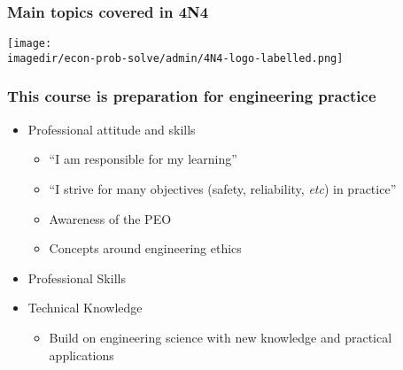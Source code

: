 \begin{frame}\frametitle{Main topics covered in 4N4}
	\begin{center}
		\texttt{[image: \\imagedir/econ-prob-solve/admin/4N4-logo-labelled.png]}
	\end{center}
	\vspace{-12pt}
	{\small {\color{brown}{This is a unique course: not taught anywhere else in Canada.}}}
\end{frame}

\begin{frame}\frametitle{This course is preparation for engineering practice}
	\begin{itemize}
		\item	Professional attitude and skills
		\begin{itemize}
			\item	``I am responsible for my learning''
			\item	``I strive for many objectives (safety, reliability, \emph{etc}) in practice''
			\item	Awareness of the PEO
			\item	Concepts around engineering ethics
		\end{itemize}
		\item	Professional Skills
		\item	Technical Knowledge
		\begin{itemize}
			\item	Build on engineering science with new knowledge and practical applications
		\end{itemize}
	\end{itemize}
\end{frame}

